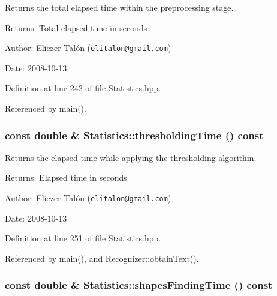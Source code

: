 Returns the total elapsed time within the preprocessing stage. 

\begin{Desc}
\item[Returns:]Total elapsed time in seconds\end{Desc}
\begin{Desc}
\item[Author:]Eliezer Talón (\href{mailto:elitalon@gmail.com}{\tt elitalon@gmail.com}) \end{Desc}
\begin{Desc}
\item[Date:]2008-10-13 \end{Desc}


Definition at line 242 of file Statistics.hpp.

Referenced by main().\hypertarget{class_statistics_51a8c70011a201873db8f388dad733ac}{
\subsubsection[thresholdingTime]{\setlength{\rightskip}{0pt plus 5cm}const double \& Statistics::thresholdingTime () const}}
\label{class_statistics_51a8c70011a201873db8f388dad733ac}


Returns the elapsed time while applying the thresholding algorithm. 

\begin{Desc}
\item[Returns:]Elapsed time in seconds\end{Desc}
\begin{Desc}
\item[Author:]Eliezer Talón (\href{mailto:elitalon@gmail.com}{\tt elitalon@gmail.com}) \end{Desc}
\begin{Desc}
\item[Date:]2008-10-13 \end{Desc}


Definition at line 251 of file Statistics.hpp.

Referenced by main(), and Recognizer::obtainText().\hypertarget{class_statistics_9437fbc6726c6179b3ee4c130520e642}{
\subsubsection[shapesFindingTime]{\setlength{\rightskip}{0pt plus 5cm}const double \& Statistics::shapesFindingTime () const}}
\label{class_statistics_9437fbc6726c6179b3ee4c130520e642}


